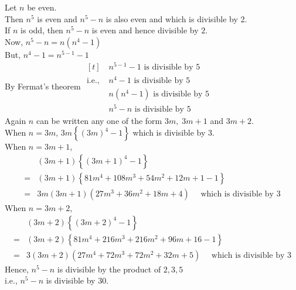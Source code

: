 \documentclass[12pt]{book}
\begin{document}
\begin{soln}
    Let $ n $ be even.\\
    Then $ n^5 $ is even and $ n^5-n $ is also even and which is divisible by 2.\\
    If $ n $ is odd, then $ n^5-n $ is even and hence divisible by $ 2 $.\\
    Now, $ n^5-n =n(n^4-1)$\\
    But, $ n^4-1 =n^{5-1}-1$\\
    By Fermat's theorem $ \begin{aligned}[t]
                          & n^{5-1}-1 \text{ is divisible by } 5  \\
            \text{i.e., } & n^{4}-1 \text{ is divisible by } 5    \\
                          & n(n^{4}-1) \text{ is divisible by } 5 \\
                          & n^{5}-n \text{ is divisible by } 5
        \end{aligned} $\\
    Again $ n $ can be written any one of the form $ 3m,\;3m+1 $ and $ 3m+2 $.\\
    When $ n=3m $, $ 3m\left\{ (3m)^4-1 \right\} $ which is divisible by 3.\\
    When $ n=3m+1 $,
    \begin{align*}
          & (3m+1)\left\{ (3m+1)^4-1 \right\}                                  \\
        = & (3m+1)\left\{ 81m^4+108m^3+54m^2+12m+1-1 \right\}                  \\
        = & 3m(3m+1)( 27m^3+36m^2+18m+4 ) \quad\text{ which is divisible by }3
    \end{align*}
    When $ n=3m+2 $,
    \begin{align*}
          & (3m+2)\left\{ (3m+2)^4-1 \right\}                                       \\
        = & (3m+2)\left\{ 81m^4+216m^3+216m^2+96m+16-1 \right\}                     \\
        = & 3(3m+2)( 27m^4+72m^3+72m^2+32m+5 ) \quad\text{ which is divisible by }3
    \end{align*}
    Hence,  $ n^5-n $ is divisible by the product of $ 2,3,5 $\\
    i.e.,  $ n^5-n $ is divisible by 30.
    
\end{soln}
\end{document}
